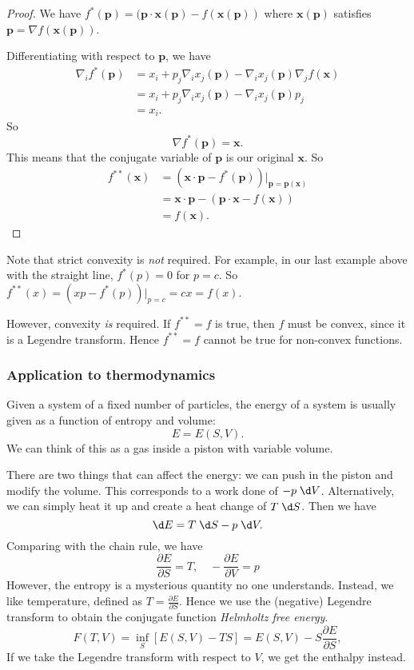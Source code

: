 \documentclass[a4paper]{article}
\begin{document}
\begin{proof}
  We have $f^*(\mathbf{p}) = (\mathbf{p}\cdot\mathbf{x}(\mathbf{p}) - f(\mathbf{x}(\mathbf{p}))$ where $\mathbf{x}(\mathbf{p})$ satisfies $\mathbf{p} = \nabla f(\mathbf{x}(\mathbf{p}))$.

  Differentiating with respect to $\mathbf{p}$, we have
  \begin{align*}
    \nabla_i f^*(\mathbf{p}) &= x_i + p_j \nabla_i x_j (\mathbf{p}) - \nabla_i x_j(\mathbf{p}) \nabla_j f(\mathbf{x})\\
    &= x_i + p_j \nabla_i x_j(\mathbf{p}) - \nabla_i x_j(\mathbf{p}) p_j\\
    &= x_i.
  \end{align*}
  So
  \[
    \nabla f^*(\mathbf{p}) = \mathbf{x}.
  \]
  This means that the conjugate variable of $\mathbf{p}$ is our original $\mathbf{x}$. So
  \begin{align*}
    f^{**}(\mathbf{x}) &= (\mathbf{x} \cdot \mathbf{p} - f^*(\mathbf{p}))|_{\mathbf{p} = \mathbf{p}(\mathbf{x})}\\
    &= \mathbf{x}\cdot \mathbf{p} - (\mathbf{p}\cdot \mathbf{x} - f(\mathbf{x}))\\
    &= f(\mathbf{x}).
  \end{align*}
\end{proof}
Note that strict convexity is \emph{not} required. For example, in our last example above with the straight line, $f^*(p) = 0$ for $p = c$. So $f^{**}(x) = (xp - f^*(p))|_{p = c} = cx = f(x)$.

However, convexity \emph{is} required. If $f^{**} = f$ is true, then $f$ must be convex, since it is a Legendre transform. Hence $f^{**} = f$ cannot be true for non-convex functions.

\subsubsection*{Application to thermodynamics}
Given a system of a fixed number of particles, the energy of a system is usually given as a function of entropy and volume:
\[
  E = E(S, V).
\]
We can think of this as a gas inside a piston with variable volume.

There are two things that can affect the energy: we can push in the piston and modify the volume. This corresponds to a work done of $-p\;\d V$. Alternatively, we can simply heat it up and create a heat change of $T\;\d S$. Then we have
\[
  \d E = T\;\d S - p\;\d V.
\]
Comparing with the chain rule, we have
\[
  \frac{\partial E}{\partial S} = T,\quad -\frac{\partial E}{\partial V} = p
\]
However, the entropy is a mysterious quantity no one understands. Instead, we like temperature, defined as $T = \frac{\partial E}{\partial S}$. Hence we use the (negative) Legendre transform to obtain the conjugate function \emph{Helmholtz free energy}.
\[
  F(T, V) = \inf_S [E(S, V) - TS] = E(S, V) - S\frac{\partial E}{\partial S},
\]
If we take the Legendre transform with respect to $V$, we get the enthalpy instead.
\end{document}
